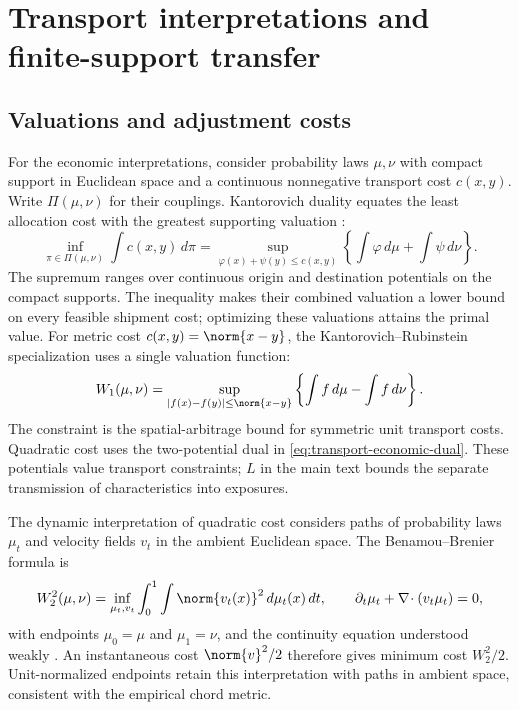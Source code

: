 \section{Transport interpretations and finite-support
transfer}\label{app:finite-support-transfer}

\subsection{Valuations and adjustment costs}
\label{sec:transport-economic-interpretation}

For the economic interpretations, consider probability laws $\mu,\nu$ with
compact support in Euclidean space and a continuous nonnegative transport
cost $c(x,y)$.
Write $\Pi(\mu,\nu)$ for their couplings.
Kantorovich duality equates the least allocation cost with the greatest
supporting valuation \citep{panaretos_invitation_2020}:
\begin{equation}\label{eq:transport-economic-dual}
  \inf_{\pi\in\Pi(\mu,\nu)}\int c(x,y)\,d\pi
  =\sup_{\varphi(x)+\psi(y)\le c(x,y)}
  \left\{\int\varphi\,d\mu+\int\psi\,d\nu\right\}.
\end{equation}
The supremum ranges over continuous origin and destination potentials on
the compact supports.
The inequality makes their combined valuation a lower bound on every
feasible shipment cost; optimizing these valuations attains the primal value.
For metric cost $c(x,y)=\norm{x-y}$, the Kantorovich--Rubinstein
specialization uses a single valuation function:
\begin{equation}\label{eq:transport-economic-w1}
  W_1(\mu,\nu)
  =\sup_{|f(x)-f(y)|\le\norm{x-y}}
  \left\{\int f\,d\mu-\int f\,d\nu\right\}.
\end{equation}
The constraint is the spatial-arbitrage bound for symmetric unit transport
costs.
Quadratic cost uses the two-potential dual in
\eqref{eq:transport-economic-dual}.
These potentials value transport constraints; $L$ in the main text bounds
the separate transmission of characteristics into exposures.

The dynamic interpretation of quadratic cost considers paths of probability
laws $\mu_t$ and velocity fields $v_t$ in the ambient Euclidean space.
The Benamou--Brenier formula is
\begin{equation}\label{eq:transport-economic-action}
  W_2^2(\mu,\nu)
  =\inf_{\mu_t,v_t}\int_0^1\int\norm{v_t(x)}^2\,d\mu_t(x)\,dt,
  \qquad
  \partial_t\mu_t+\nabla\!\cdot(v_t\mu_t)=0,
\end{equation}
with endpoints $\mu_0=\mu$ and $\mu_1=\nu$, and the continuity equation
understood weakly \citep{benamou_brenier_2000}.
An instantaneous cost $\norm{v}^2/2$ therefore gives minimum cost $W_2^2/2$.
Unit-normalized endpoints retain this interpretation with paths in ambient
space, consistent with the empirical chord metric.

